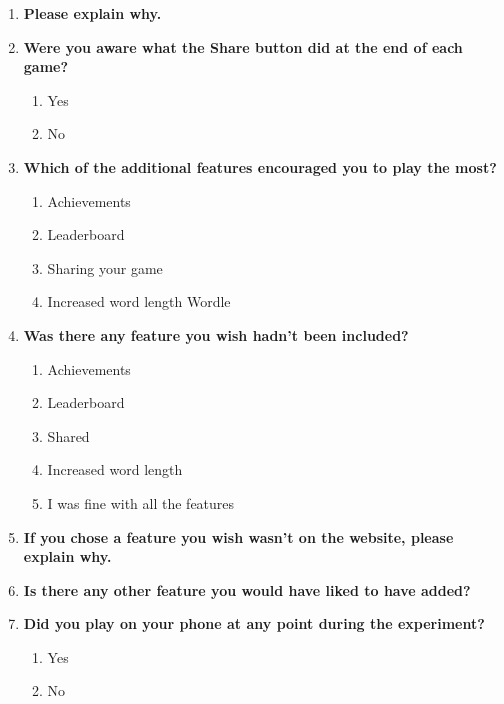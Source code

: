 \begin{enumerate}
    \item \textbf{Please explain why.}
    \vspace{2cm}
    \hrulefill

    \item \textbf{Were you aware what the Share button did at the end of each game?}
    \begin{enumerate}[label=(\arabic*)]
        \item Yes
        \item No
    \end{enumerate}

    \item \textbf{Which of the additional features encouraged you to play the most?}
    \begin{enumerate}[label=(\arabic*)]
        \item Achievements
        \item Leaderboard
        \item Sharing your game
        \item Increased word length Wordle
    \end{enumerate}

    \item \textbf{Was there any feature you wish hadn't been included?}
    \begin{enumerate}[label=(\arabic*)]
        \item Achievements
        \item Leaderboard
        \item Shared
        \item Increased word length
        \item I was fine with all the features
    \end{enumerate}

    \item \textbf{If you chose a feature you wish wasn't on the website, please explain why.}
    \vspace{2cm}
    \hrulefill

    \item \textbf{Is there any other feature you would have liked to have added?}
    \vspace{2cm}
    \hrulefill

    \item \textbf{Did you play on your phone at any point during the experiment?}
    \begin{enumerate}[label=(\arabic*)]
        \item Yes
        \item No
    \end{enumerate}


\end{enumerate}
